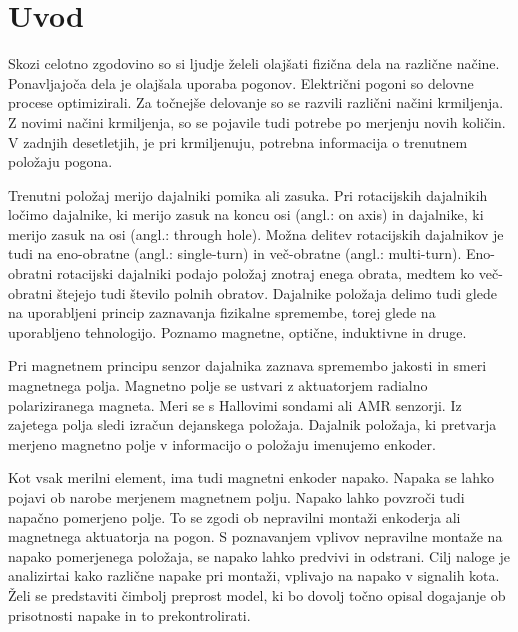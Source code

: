 \chapter{Uvod} \label{uvod}

Skozi celotno zgodovino so si ljudje želeli olajšati fizična dela na različne načine. Ponavljajoča dela je olajšala uporaba pogonov. Električni pogoni so delovne procese optimizirali. Za točnejše delovanje so se razvili različni načini krmiljenja. Z novimi načini krmiljenja, so se pojavile tudi potrebe po merjenju novih količin. V zadnjih desetletjih, je pri krmiljenuju, potrebna informacija o trenutnem položaju pogona.

Trenutni položaj merijo dajalniki pomika ali zasuka\cite{uporabaSenzorjev}. Pri rotacijskih dajalnikih ločimo dajalnike, ki merijo zasuk na koncu osi (angl.: on axis) in dajalnike, ki merijo zasuk na osi (angl.: through hole). Možna delitev rotacijskih dajalnikov je tudi na eno-obratne (angl.: single-turn) in več-obratne (angl.: multi-turn). Eno-obratni rotacijski dajalniki podajo položaj znotraj enega obrata, medtem ko več-obratni štejejo tudi število polnih obratov. Dajalnike položaja delimo tudi glede na uporabljeni princip zaznavanja fizikalne
spremembe, torej glede na uporabljeno tehnologijo. Poznamo magnetne, optične,
induktivne in druge\cite{killer}.

Pri magnetnem principu senzor dajalnika zaznava spremembo jakosti in smeri
magnetnega polja. 
Magnetno polje se ustvari z aktuatorjem radialno polariziranega magneta. Meri se s Hallovimi sondami ali AMR senzorji. Iz zajetega polja sledi izračun dejanskega položaja. Dajalnik položaja, ki pretvarja merjeno magnetno polje v informacijo o položaju imenujemo enkoder\cite{enkoder}.

Kot vsak merilni element, ima tudi magnetni enkoder napako. Napaka se lahko pojavi ob narobe merjenem magnetnem polju\cite{RLS3}. Napako lahko povzroči tudi napačno pomerjeno polje. To se zgodi ob nepravilni montaži enkoderja ali magnetnega aktuatorja na pogon. S poznavanjem vplivov nepravilne montaže na napako pomerjenega položaja, se napako lahko predvivi in odstrani.
Cilj naloge je analizirtai kako različne napake pri montaži, vplivajo na napako v signalih kota.
Želi se predstaviti čimbolj preprost model, ki bo dovolj točno opisal dogajanje ob prisotnosti napake in to prekontrolirati.




